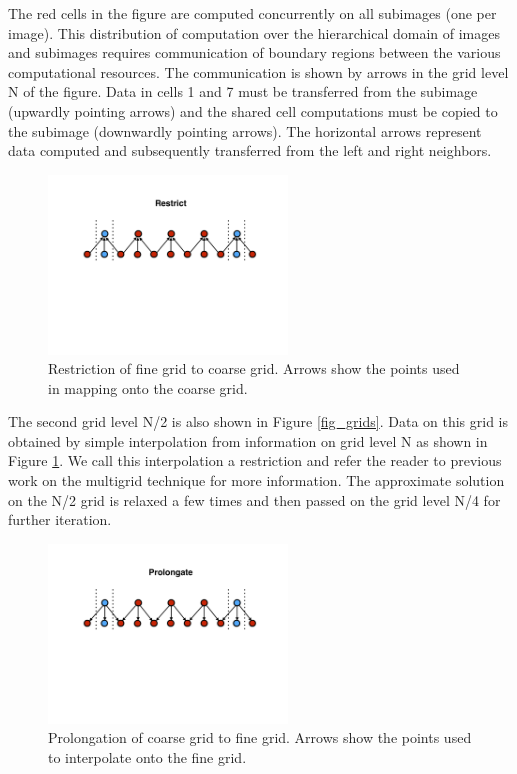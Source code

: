 The red cells in the figure are computed concurrently on all subimages (one per image).
This distribution of computation over the hierarchical domain of images and subimages
requires communication of boundary regions between the various computational resources.
The communication is shown by arrows in the grid level N of the figure.  Data in cells 1
and 7 must be transferred from the subimage (upwardly pointing arrows) and the shared cell
computations must be copied to the subimage (downwardly pointing arrows). The horizontal
arrows represent data computed and subsequently transferred from the left and right
neighbors.

\begin{figure}[!t]
\centering
\includegraphics[width=2.5in]{Fig2}
\caption{Restriction of fine grid to coarse grid. Arrows show the points used in
         mapping onto the coarse grid.}
\label{fig_restric}
\end{figure}

The second grid level N/2 is also shown in Figure \ref{fig_grids}.  Data on this grid is obtained
by simple interpolation from information on grid level N as shown in Figure \ref{fig_restric}.
We call this interpolation a restriction and refer the reader to previous work on the multigrid
technique for more information\cite{multigrid_methods}.  The approximate solution on the N/2
grid is relaxed a few times and then passed on the grid level N/4 for further iteration.

\begin{figure}[!t]
\centering
\includegraphics[width=2.5in]{Fig3}
\caption{Prolongation of coarse grid to fine grid. Arrows show the points used to
         interpolate onto the fine grid.}
\label{fig_prolongate}
\end{figure}

